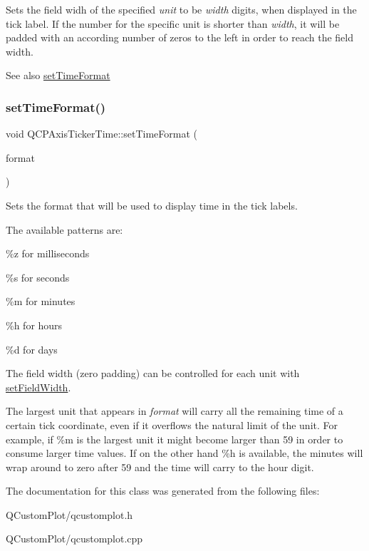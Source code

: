 Sets the field widh of the specified {\itshape unit} to be {\itshape width} digits, when displayed in the tick label. If the number for the specific unit is shorter than {\itshape width}, it will be padded with an according number of zeros to the left in order to reach the field width.

\begin{DoxySeeAlso}{See also}
\mbox{\hyperlink{class_q_c_p_axis_ticker_time_a2f30b6e5125bce4256be9ce3177088ea}{set\+Time\+Format}} 
\end{DoxySeeAlso}
\mbox{\label{class_q_c_p_axis_ticker_time_a2f30b6e5125bce4256be9ce3177088ea}} 
\subsubsection{\texorpdfstring{set\+Time\+Format()}{setTimeFormat()}}
{\footnotesize\ttfamily void Q\+C\+P\+Axis\+Ticker\+Time\+::set\+Time\+Format (\begin{DoxyParamCaption}\item[{const Q\+String \&}]{format }\end{DoxyParamCaption})}

Sets the format that will be used to display time in the tick labels.

The available patterns are\+:
\begin{DoxyItemize}
\item \%z for milliseconds
\item \%s for seconds
\item \%m for minutes
\item \%h for hours
\item \%d for days
\end{DoxyItemize}

The field width (zero padding) can be controlled for each unit with \mbox{\hyperlink{class_q_c_p_axis_ticker_time_adc13e54fc969be98a5c0e3fa0dbaa293}{set\+Field\+Width}}.

The largest unit that appears in {\itshape format} will carry all the remaining time of a certain tick coordinate, even if it overflows the natural limit of the unit. For example, if \%m is the largest unit it might become larger than 59 in order to consume larger time values. If on the other hand \%h is available, the minutes will wrap around to zero after 59 and the time will carry to the hour digit. 

The documentation for this class was generated from the following files\+:\begin{DoxyCompactItemize}
\item 
Q\+Custom\+Plot/qcustomplot.\+h\item 
Q\+Custom\+Plot/qcustomplot.\+cpp\end{DoxyCompactItemize}
